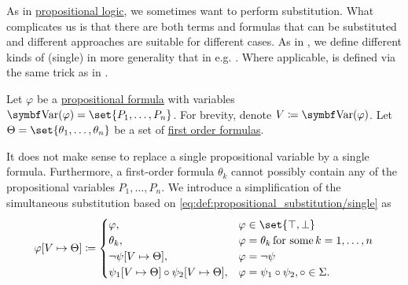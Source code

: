 \begin{definition}\label{def:first_order_substitution}
  As in \hyperref[subsec:language_of_propositional_logic]{propositional logic}, we sometimes want to perform substitution. What complicates us is that there are both terms and formulas that can be substituted and different approaches are suitable for different cases. As in , we define different kinds of (single)  in more generality that in e.g. \cite[def. 14.25]{OpenLogic20201202}. Where applicable,  is defined via the same trick as in .

  \begin{defenum}
     Let \( \varphi \) be a \hyperref[def:propositional_syntax/formula]{propositional formula} with variables \( \bfop{Var}(\varphi) = \set{ P_1, \ldots, P_n } \). For brevity, denote \( V \coloneqq \bfop{Var}(\varphi) \). Let \( \Theta = \set{ \theta_1, \ldots, \theta_n } \) be a set of \hyperref[def:first_order_syntax/formula]{first order formulas}.

    It does not make sense to replace a single propositional variable by a single formula. Furthermore, a first-order formula \( \theta_k \) cannot possibly contain any of the propositional variables \( P_1, \ldots, P_n \). We introduce a simplification of the simultaneous substitution based on \eqref{eq:def:propositional_substitution/single} as
    \begin{equation}\label{eq:def:first_order_substitution/predicate}
      \varphi[V \mapsto \Theta] \coloneqq \begin{cases}
        \varphi,                                             &\varphi \in \set{ \top, \bot } \\
        \theta_k,                                            &\varphi = \theta_k \T{for some} k = 1, \ldots, n \\
        \neg \psi[V \mapsto \Theta],                           &\varphi = \neg \psi \\
        \psi_1[V \mapsto \Theta] \circ \psi_2[V \mapsto \Theta], &\varphi = \psi_1 \circ \psi_2, \circ \in \Sigma.
      \end{cases}
    \end{equation}


\end{defenum}
\end{definition}
